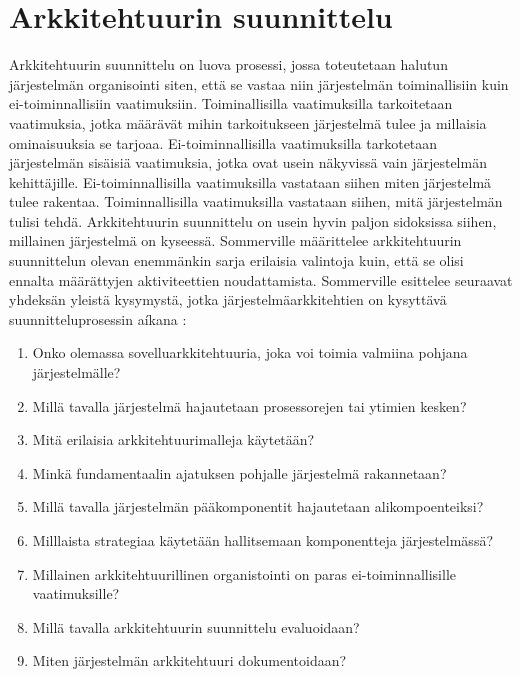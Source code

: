 \documentclass[utf8]{gradu3}
\begin{document}
\section{Arkkitehtuurin suunnittelu}

Arkkitehtuurin suunnittelu on luova prosessi, jossa toteutetaan halutun järjestelmän organisointi siten, että se vastaa niin järjestelmän toiminallisiin kuin ei-toiminnallisiin vaatimuksiin. Toiminallisilla vaatimuksilla tarkoitetaan vaatimuksia, jotka määrävät mihin tarkoitukseen järjestelmä tulee ja millaisia ominaisuuksia se tarjoaa. Ei-toiminnallisilla vaatimuksilla tarkotetaan järjestelmän sisäisiä vaatimuksia, jotka ovat usein näkyvissä vain järjestelmän kehittäjille. Ei-toiminnallisilla vaatimuksilla vastataan siihen miten järjestelmä tulee rakentaa. Toiminnallisilla vaatimuksilla vastataan siihen, mitä järjestelmän tulisi tehdä.  Arkkitehtuurin suunnittelu on usein hyvin paljon sidoksissa siihen, millainen järjestelmä on kyseessä. Sommerville määrittelee arkkitehtuurin suunnittelun olevan enemmänkin sarja erilaisia valintoja kuin, että se olisi ennalta määrättyjen aktiviteettien noudattamista. Sommerville esittelee seuraavat yhdeksän yleistä kysymystä, jotka järjestelmäarkkitehtien on kysyttävä suunnitteluprosessin aíkana \parencite[s. 151]{Sommerville}:

\begin{enumerate}  
\item Onko olemassa sovelluarkkitehtuuria, joka voi toimia valmiina pohjana järjestelmälle?
\item Millä tavalla järjestelmä hajautetaan prosessorejen tai ytimien kesken?
\item Mitä erilaisia arkkitehtuurimalleja käytetään?
\item Minkä fundamentaalin ajatuksen pohjalle järjestelmä rakannetaan?
\item Millä tavalla järjestelmän pääkomponentit hajautetaan alikompoenteiksi?
\item Milllaista strategiaa käytetään hallitsemaan komponentteja järjestelmässä?
\item Millainen arkkitehtuurillinen organistointi on paras ei-toiminnallisille vaatimuksille?
\item Millä tavalla arkkitehtuurin suunnittelu evaluoidaan?
\item Miten järjestelmän arkkitehtuuri dokumentoidaan?
\end{enumerate}
\end{document}
